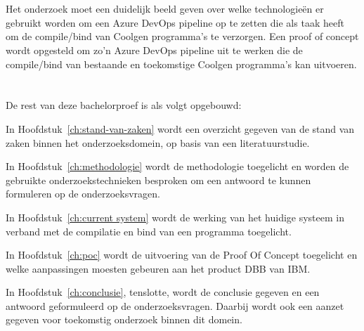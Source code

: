 \section{}%
\label{sec:onderzoeksdoelstelling}

Het onderzoek moet een duidelijk beeld geven over welke technologieën er gebruikt worden om een Azure DevOps pipeline op te zetten die als taak heeft om de compile/bind van Coolgen programma's te verzorgen.
Een proof of concept wordt opgesteld om zo'n Azure DevOps pipeline uit te werken die de compile/bind van bestaande en toekomstige Coolgen programma's kan uitvoeren. 

\section{}%
\label{sec:opzet-bachelorproef}
De rest van deze bachelorproef is als volgt opgebouwd:

In Hoofdstuk~\ref{ch:stand-van-zaken} wordt een overzicht gegeven van de stand van zaken binnen het onderzoeksdomein, op basis van een literatuurstudie.

In Hoofdstuk~\ref{ch:methodologie} wordt de methodologie toegelicht en worden de gebruikte onderzoekstechnieken besproken om een antwoord te kunnen formuleren op de onderzoeksvragen.

In Hoofdstuk~\ref{ch:current system} wordt de werking van het huidige systeem in verband met de compilatie en bind van een programma toegelicht. 

In Hoofdstuk~\ref{ch:poc} wordt de uitvoering van de Proof Of Concept toegelicht en welke aanpassingen moesten gebeuren aan het product DBB van IBM. 

In Hoofdstuk~\ref{ch:conclusie}, tenslotte, wordt de conclusie gegeven en een antwoord geformuleerd op de onderzoeksvragen. Daarbij wordt ook een aanzet gegeven voor toekomstig onderzoek binnen dit domein.